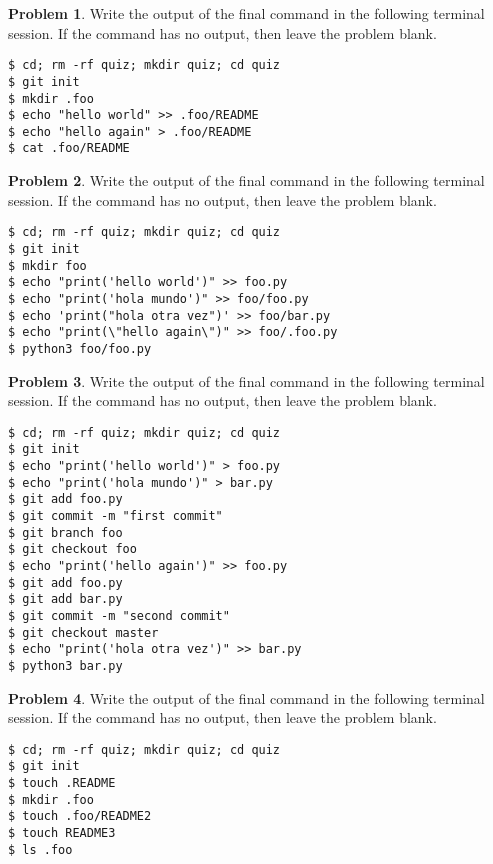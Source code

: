 \documentclass[10pt]{article}
\theoremstyle{definition}
\newtheorem{problem}{Problem}
\begin{document}
\begin{problem}
    Write the output of the final command in the following terminal session.
    If the command has no output, then leave the problem blank.
\end{problem}
\begin{lstlisting}
$ cd; rm -rf quiz; mkdir quiz; cd quiz
$ git init
$ mkdir .foo
$ echo "hello world" >> .foo/README
$ echo "hello again" > .foo/README
$ cat .foo/README
\end{lstlisting}
\vspace{1in}

\begin{problem}
    Write the output of the final command in the following terminal session.
    If the command has no output, then leave the problem blank.
\end{problem}
\begin{lstlisting}
$ cd; rm -rf quiz; mkdir quiz; cd quiz
$ git init
$ mkdir foo
$ echo "print('hello world')" >> foo.py
$ echo "print('hola mundo')" >> foo/foo.py
$ echo 'print("hola otra vez")' >> foo/bar.py
$ echo "print(\"hello again\")" >> foo/.foo.py
$ python3 foo/foo.py
\end{lstlisting}
\vspace{1in}

\begin{problem}
    Write the output of the final command in the following terminal session.
    If the command has no output, then leave the problem blank.
\end{problem}
\begin{lstlisting}
$ cd; rm -rf quiz; mkdir quiz; cd quiz
$ git init
$ echo "print('hello world')" > foo.py
$ echo "print('hola mundo')" > bar.py
$ git add foo.py
$ git commit -m "first commit"
$ git branch foo
$ git checkout foo
$ echo "print('hello again')" >> foo.py
$ git add foo.py
$ git add bar.py
$ git commit -m "second commit"
$ git checkout master
$ echo "print('hola otra vez')" >> bar.py
$ python3 bar.py
\end{lstlisting}
\vspace{1in}


\begin{problem}
    Write the output of the final command in the following terminal session.
    If the command has no output, then leave the problem blank.
\end{problem}
\begin{lstlisting}
$ cd; rm -rf quiz; mkdir quiz; cd quiz
$ git init
$ touch .README
$ mkdir .foo
$ touch .foo/README2
$ touch README3
$ ls .foo
\end{lstlisting}
\vspace{1in}
\end{document}
